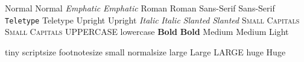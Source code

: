 \textnormal{Normal}	{\normalfont Normal} %
\emph{Emphatic}		{\em Emphatic}
\textrm{Roman} 		{\rmfamily Roman}
\textsf{Sans-Serif} 	{\sffamily Sans-Serif}
\texttt{Teletype} 	{\ttfamily Teletype}
\textup{Upright} 	{\upshape Upright} %
\textit{Italic} 	{\itshape Italic}
\textsl{Slanted} 	{\slshape Slanted}
\textsc{Small Capitals}	{\scshape Small Capitals}
\uppercase{Uppercase}	\lowercase{Lowercase}
\textbf{Bold}		{\bfseries Bold}
\textmd{Medium} 	{\mdseries Medium} %
		{\lfseries Light}

{\tiny tiny}
{\scriptsize scriptsize}
{\footnotesize footnotesize}
{\small small}
{\normalsize normalsize} %
{\large large}
{\Large Large}
{\LARGE LARGE}
{\huge huge}
{\Huge Huge}
